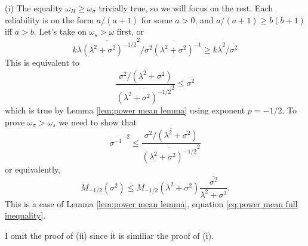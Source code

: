 \documentclass{article}
\makeatletter
\theoremstyle{plain}
\theoremstyle{plain}
\theoremstyle{definition}
\theoremstyle{remark}
\theoremstyle{definition}
\theoremstyle{plain}
\theoremstyle{plain}
\theoremstyle{definition}
\newenvironment{proof}[1][\protect\proofname]{\par
	\normalfont\topsep6\p@\@plus6\p@\relax
	\trivlist
	\itemindent\parindent
	\item[\hskip\labelsep\scshape #1]\ignorespaces
}{%
	\endtrivlist\@endpefalse
}
\providecommand{\proofname}{Proof}
\makeatother
\begin{document}
\begin{proof}[Proof of Proposition \ref{prop:Properties of three}]\label{proof:Properties}
(i) The equality $\omega_H \geq \omega_\sigma$ trivially true, so we will focus on the rest. Each reliability is on the form $a/(a+1)$ for some $a>0$, and $a/(a+1)\geq b(b+1)$
iff $a>b$. Let's take on $\omega_s > \omega$ first, or
\[
k\overline{\lambda(\lambda^{2}+\sigma^{2})^{-1/2}}^{2}/\overline{\sigma^{2}(\lambda^{2}+\sigma^{2})^{-1}}\geq k\overline{\lambda}^{2}/\overline{\sigma^{2}}
\]
This is equivalent to 
\[
\frac{\overline{\sigma^{2}/(\lambda^{2}+\sigma^{2})}}{\overline{(\lambda^{2}+\sigma^{2})^{-1/2}}^{2}}\leq\overline{\sigma^{2}}
\]
which is true by Lemma \ref{lem:power mean lemma} using exponent $p = -1/2$.
To prove $\omega_{\sigma}>\omega_{s}$ we need to show that
\[
\overline{\sigma^{-1}}^{-2}\leq\frac{\overline{\sigma^{2}/(\lambda^{2}+\sigma^{2})}}{\overline{(\lambda^{2}+\sigma^{2})^{-1/2}}^{2}}
\]
or equivalently,
\[
M_{-1/2}\left(\sigma^{2}\right)\leq M_{-1/2}\left(\lambda^{2}+\sigma^{2}\right)\overline{\frac{\sigma^{2}}{\lambda^{2}+\sigma^{2}}}.
\]
This is a case of Lemma \ref{lem:power mean lemma}, equation \eqref{eq:power mean full inequality}.

I omit the proof of (ii) since it is similiar the proof of (i).


\end{proof}



\end{document}
